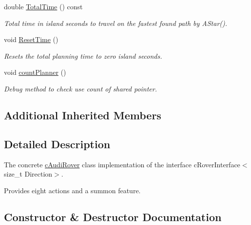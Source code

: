 \begin{DoxyCompactItemize}
\mbox{\label{classplanner_1_1c_audi_rover_a3457f112b5906654ca4dbefef7ea7e46}} 
double \mbox{\hyperlink{classplanner_1_1c_audi_rover_a3457f112b5906654ca4dbefef7ea7e46}{Total\+Time}} () const
\begin{DoxyCompactList}\small\item\em Total time in island seconds to travel on the fastest found path by A\+Star(). \end{DoxyCompactList}\item 
\mbox{\label{classplanner_1_1c_audi_rover_a581d4a30c727d6fbe224b317834a45ba}} 
void \mbox{\hyperlink{classplanner_1_1c_audi_rover_a581d4a30c727d6fbe224b317834a45ba}{Reset\+Time}} ()
\begin{DoxyCompactList}\small\item\em Resets the total planning time to zero island seconds. \end{DoxyCompactList}\item 
\mbox{\label{classplanner_1_1c_audi_rover_ab4ff29dbdcf096e9f3ec0a734ed7b2d3}} 
void \mbox{\hyperlink{classplanner_1_1c_audi_rover_ab4ff29dbdcf096e9f3ec0a734ed7b2d3}{count\+Planner}} ()
\begin{DoxyCompactList}\small\item\em Debug method to check use count of shared pointer. \end{DoxyCompactList}\end{DoxyCompactItemize}
\subsection*{Additional Inherited Members}


\subsection{Detailed Description}
The concrete \mbox{\hyperlink{classplanner_1_1c_audi_rover}{c\+Audi\+Rover}} class implementation of the interface c\+Rover\+Interface$<$size\+\_\+t Direction$>$. 

Provides eight actions and a summon feature. 

\subsection{Constructor \& Destructor Documentation}
\mbox{\label{classplanner_1_1c_audi_rover_abafb926aca93fb8382284a10bd341986}} 
